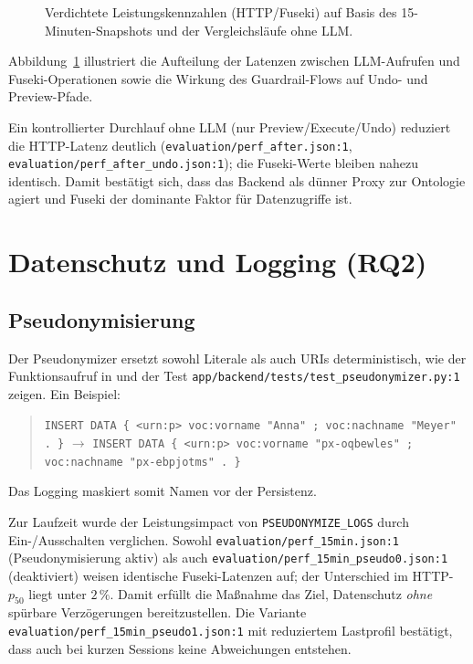 \begin{figure}[ht]
  \centering
  
  \caption{Verdichtete Leistungskennzahlen (HTTP/Fuseki) auf Basis des 15-Minuten-Snapshots und der Vergleichsläufe ohne LLM.}
  \label{fig:evaluation-metrics}
\end{figure}

Abbildung~\ref{fig:evaluation-metrics} illustriert die Aufteilung der Latenzen zwischen LLM-Aufrufen und Fuseki-Operationen sowie die Wirkung des Guardrail-Flows auf Undo- und Preview-Pfade.

Ein kontrollierter Durchlauf ohne LLM (nur Preview/Execute/Undo) reduziert die HTTP-Latenz deutlich (\texttt{evaluation/perf\_after.json:1}, \texttt{evaluation/perf\_after\_undo.json:1}); die Fuseki-Werte bleiben nahezu identisch. Damit bestätigt sich, dass das Backend als dünner Proxy zur Ontologie agiert und Fuseki der dominante Faktor für Datenzugriffe ist.

\section{Datenschutz und Logging (RQ2)}

\subsection{Pseudonymisierung}
Der Pseudonymizer ersetzt sowohl Literale als auch URIs deterministisch, wie der Funktionsaufruf in  und der Test \texttt{app/backend/tests/test\_pseudonymizer.py:1} zeigen. Ein Beispiel:
\begin{quote}
\texttt{INSERT DATA \{ <urn:p> voc:vorname "Anna" ; voc:nachname "Meyer" . \}} 
\quad$\rightarrow$\quad
\texttt{INSERT DATA \{ <urn:p> voc:vorname "px-oqbewles" ; voc:nachname "px-ebpjotms" . \}}
\end{quote}
Das Logging maskiert somit Namen vor der Persistenz.

Zur Laufzeit wurde der Leistungsimpact von \texttt{PSEUDONYMIZE\_LOGS} durch Ein-/Ausschalten verglichen. Sowohl \texttt{evaluation/perf\_15min.json:1} (Pseudonymisierung aktiv) als auch \texttt{evaluation/perf\_15min\_pseudo0.json:1} (deaktiviert) weisen identische Fuseki-Latenzen auf; der Unterschied im HTTP-$p_{50}$ liegt unter $2\,\%$. Damit erfüllt die Maßnahme das Ziel, Datenschutz \emph{ohne} spürbare Verzögerungen bereitzustellen. Die Variante \texttt{evaluation/perf\_15min\_pseudo1.json:1} mit reduziertem Lastprofil bestätigt, dass auch bei kurzen Sessions keine Abweichungen entstehen.


